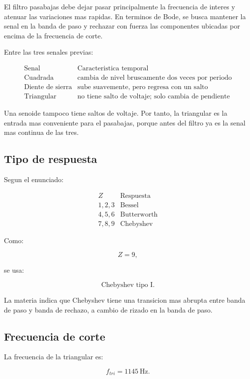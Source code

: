 \documentclass[11pt,letterpaper]{article}
\begin{document}
El filtro pasabajas debe dejar pasar principalmente la frecuencia de interes y
atenuar las variaciones mas rapidas. En terminos de Bode, se busca mantener la
senal en la banda de paso y rechazar con fuerza las componentes ubicadas por
encima de la frecuencia de corte.

Entre las tres senales previas:

\[
\begin{array}{c|c}
\text{Senal} & \text{Caracteristica temporal} \\
\hline
\text{Cuadrada} & \text{cambia de nivel bruscamente dos veces por periodo}\\
\text{Diente de sierra} & \text{sube suavemente, pero regresa con un salto}\\
\text{Triangular} & \text{no tiene salto de voltaje; solo cambia de pendiente}
\end{array}
\]

Una senoide tampoco tiene saltos de voltaje. Por tanto, la triangular es la
entrada mas conveniente para el pasabajas, porque antes del filtro ya es la
senal mas continua de las tres.

\subsection{Tipo de respuesta}

Segun el enunciado:

\[
\begin{array}{c|c}
Z & \text{Respuesta} \\
\hline
1,2,3 & \text{Bessel}\\
4,5,6 & \text{Butterworth}\\
7,8,9 & \text{Chebyshev}
\end{array}
\]

Como:

\[
Z=9,
\]

se usa:

\[
\boxed{\text{Chebyshev tipo I}}.
\]

La materia indica que Chebyshev tiene una transicion mas abrupta entre banda de
paso y banda de rechazo, a cambio de rizado en la banda de paso.

\subsection{Frecuencia de corte}

La frecuencia de la triangular es:

\[
f_{tri}=1145~\text{Hz}.
\]
\end{document}
